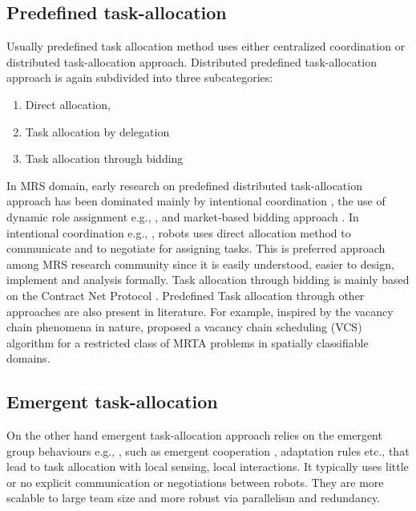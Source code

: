 \subsection{Predefined task-allocation}
Usually predefined task allocation method uses either centralized coordination or distributed task-allocation approach. Distributed predefined task-allocation approach is again subdivided into three subcategories: 
\begin{enumerate}
\item Direct allocation, 
\item Task allocation by delegation 
\item Task allocation through bidding
\end{enumerate}
In MRS domain, early research on predefined distributed task-allocation approach has been dominated mainly by intentional coordination \cite{Gerkey+2004,Parker1998}, the use of dynamic role assignment e.g., \cite{Chaimowicz2002}, and market-based bidding approach \cite{Dias+2006}. In intentional coordination e.g., \cite{Parker1998}, robots uses direct allocation method to communicate and to negotiate for assigning tasks. This is preferred approach among MRS research community since it is easily understood, easier to design, implement and analysis formally. Task allocation through bidding is mainly based on the Contract Net Protocol \cite{Davis1988+}. Predefined Task allocation through other approaches are also present in literature. For example, inspired by the vacancy chain phenomena in nature, \cite{Dahl+2003} proposed a vacancy chain scheduling (VCS) algorithm for a restricted class of MRTA problems in spatially classifiable domains.

\subsection{Emergent task-allocation}
On the other hand emergent task-allocation approach relies on the emergent group behaviours e.g., \cite{Kube+1993}, such as emergent cooperation \cite{Lerman+2006}, adaptation rules \cite{Liu+2007} etc., that lead to task allocation with local sensing, local interactions. It typically uses little or no explicit communication or negotiations between robots. They are more scalable to large team size and more robust via parallelism and redundancy.

